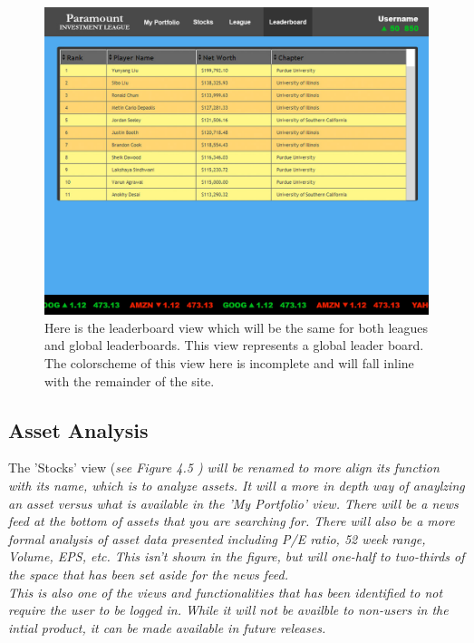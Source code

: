 \begin{figure}
\centering
\includegraphics[width=5.5in]{./img/mock/leaderboard.jpg}
\caption{Here is the leaderboard view which will be the same for both leagues and global
leaderboards. This view represents a global leader board.  The colorscheme of this view
here is incomplete and will fall inline with the remainder of the site.}
\end{figure}

\subsection{Asset Analysis}
The 'Stocks' view (\em see Figure 4.5 \em) will be renamed to more align its function
with its name, which is to analyze assets. It will a more in depth way of anaylzing an
asset versus what is available in the 'My Portfolio' view.  There will be a news feed
at the bottom of assets that you are searching for. There will also be a more formal
analysis of asset data presented including P/E ratio, 52 week range, Volume, EPS, etc.
This isn't shown in the figure, but will one-half to two-thirds of the space that
has been set aside for the news feed.\\

This is also one of the views and functionalities that has been identified to not require
the user to be logged in.  While it will not be availble to non-users in the intial product,
it can be made available in future releases.\\

